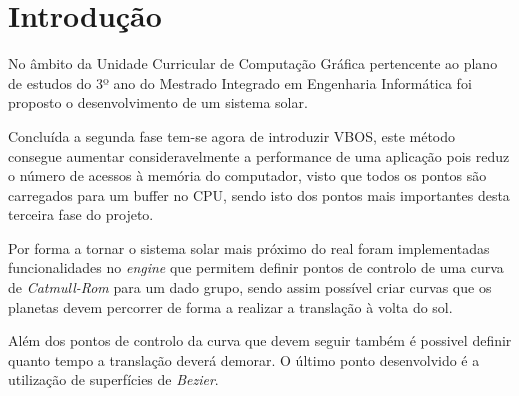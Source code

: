 \chapter{Introdução}
\label{cap:intro}

No âmbito da Unidade Curricular de Computação Gráfica pertencente ao plano de estudos do 3º ano do Mestrado Integrado em Engenharia Informática foi proposto o desenvolvimento de um sistema solar. 

Concluída a segunda fase tem-se agora de introduzir VBOS, este método consegue aumentar consideravelmente a performance de uma aplicação pois reduz o número de acessos à memória do computador, visto que todos os pontos são carregados para um buffer no CPU, sendo isto dos pontos mais importantes desta terceira fase do projeto. 

Por forma a tornar o sistema solar mais próximo do real foram implementadas funcionalidades no \textit{engine} que permitem definir pontos de controlo de uma curva de \textit{Catmull-Rom} para um dado grupo, sendo assim possível criar curvas que os planetas devem percorrer de forma a realizar a translação à volta do sol. 

Além dos pontos de controlo da curva que devem seguir também é  possivel definir quanto tempo a translação deverá demorar. O último ponto desenvolvido é a utilização de superfícies de \textit{Bezier}.
